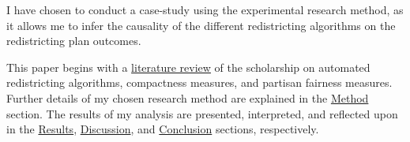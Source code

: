 I have chosen to conduct a case-study using the experimental research method, as it allows me to infer the causality of the different redistricting algorithms on the redistricting plan outcomes. 

This paper begins with a \hyperref[sec:litreview]{literature review} of the scholarship on automated redistricting algorithms, compactness measures, and partisan fairness measures. Further details of my chosen research method are explained in the \hyperref[sec:method]{Method} section. The results of my analysis are presented, interpreted, and reflected upon in the \hyperref[sec:results]{Results}, \hyperref[sec:disc]{Discussion}, and \hyperref[sec:conc]{Conclusion} sections, respectively. 